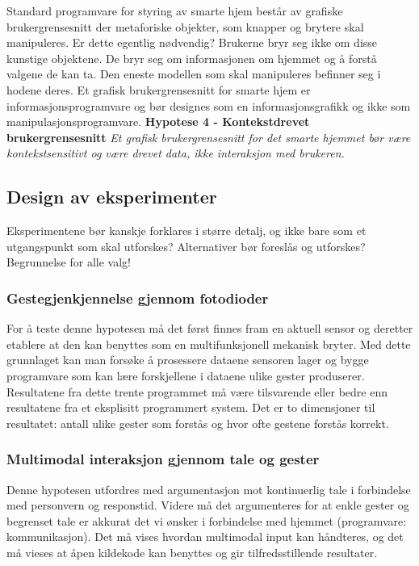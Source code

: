 Standard programvare for styring av smarte hjem består av  grafiske brukergrensesnitt der metaforiske objekter, som knapper og brytere skal manipuleres. Er dette egentlig nødvendig? Brukerne bryr seg ikke om disse kunstige objektene. De bryr seg om informasjonen om hjemmet og å forstå valgene de kan ta. Den eneste modellen som skal manipuleres befinner seg i hodene deres. Et grafisk brukergrensesnitt for smarte hjem er informasjonsprogramvare og bør designes som en informasjonsgrafikk og ikke som manipulasjonsprogramvare.\newline\newline
\textbf{Hypotese 4 - Kontekstdrevet brukergrensesnitt}\newline
\emph{Et grafisk brukergrensesnitt for det smarte hjemmet bør være kontekstsensitivt og være drevet data, ikke interaksjon med brukeren.}\newline




\subsection{Design av eksperimenter}
{\color{red}Eksperimentene bør kanskje forklares i større detalj, og ikke bare som et utgangspunkt som skal utforskes? Alternativer bør foreslås og utforskes? Begrunnelse for alle valg!}
\subsubsection*{Gestegjenkjennelse gjennom fotodioder}
For å teste denne hypotesen må det først finnes fram en aktuell sensor og deretter etablere at den kan benyttes som en multifunksjonell mekanisk bryter. Med dette grunnlaget kan man forsøke å prosessere dataene sensoren lager og bygge programvare som kan lære forskjellene i dataene ulike gester produserer. Resultatene fra dette trente programmet må være tilsvarende eller bedre enn resultatene fra et eksplisitt programmert system. Det er to dimensjoner til resultatet: antall ulike gester som forstås og hvor ofte gestene forstås korrekt.

\subsubsection*{Multimodal interaksjon gjennom tale og gester}
Denne hypotesen utfordres med argumentasjon mot kontinuerlig tale i forbindelse med personvern og responstid. Videre må det argumenteres for at enkle gester og begrenset tale er akkurat det vi ønsker i forbindelse med hjemmet (programvare: kommunikasjon). Det må vises hvordan multimodal input kan håndteres, og det må vieses at åpen kildekode kan benyttes og gir tilfredsstillende resultater.

